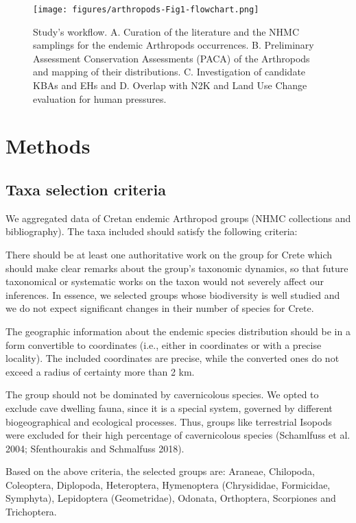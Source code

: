    \begin{figure}[h]
      \centering
      \texttt{[image: figures/arthropods-Fig1-flowchart.png]}
      \caption[The study's workflow]{Study’s workflow. A. Curation of the literature and the NHMC samplings for the endemic Arthropods occurrences. B. Preliminary Assessment Conservation Assessments (PACA) of the Arthropods and mapping of their distributions. C. Investigation of candidate KBAs and EHs and D. Overlap with N2K and Land Use Change evaluation for human pressures.}
      \label{fig:arthropods-fig1}
   \end{figure}

\section{Methods}
\label{sec:arthropods-method}
   
    \subsection{Taxa selection criteria}
    \label{subsec:arthropods-taxa-selection}

We aggregated data of Cretan endemic Arthropod groups (NHMC collections and bibliography). The taxa included should satisfy the following criteria:

There should be at least one authoritative work on the group for Crete which
should make clear remarks about the group’s taxonomic dynamics, so that future
taxonomical or systematic works on the taxon would not severely affect our inferences.
In essence, we selected groups whose biodiversity is well studied and we do not
expect significant changes in their number of species for Crete. 

The geographic information about the endemic species distribution should be in
a form convertible to coordinates (i.e., either in coordinates or with a
precise locality). The included coordinates are precise, while the converted
ones do not exceed a radius of certainty more than 2 km.

The group should not be dominated by cavernicolous species. We opted to exclude
cave dwelling fauna, since it is a special system, governed by different
biogeographical and ecological processes. Thus, groups like terrestrial Isopods
were excluded for their high percentage of cavernicolous species (Schamlfuss et al. 2004; Sfenthourakis and Schmalfuss 2018).

Based on the above criteria, the selected groups are:
Araneae, Chilopoda, Coleoptera, Diplopoda, Heteroptera, Hymenoptera (Chrysididae, Formicidae, Symphyta), Lepidoptera (Geometridae), Odonata, Orthoptera, Scorpiones and Trichoptera.

